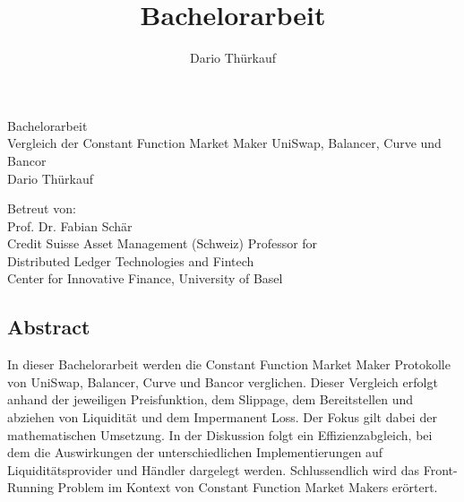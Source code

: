\documentclass[12pt,a4paper,titlepage,oneside,english]{article}
\title{Bachelorarbeit}
\author{Dario Thürkauf}
\begin{document}
\begin{center}
\vspace{1em}
\large{Bachelorarbeit}\\
\huge Vergleich der Constant Function Market Maker UniSwap, Balancer, Curve und Bancor \\
\Large \vspace{1em}
Dario Thürkauf
\end{center}

\vspace{1em}
\normalsize
\begin{flushleft}
Betreut von:\\ 
Prof. Dr. Fabian Schär \\
Credit Suisse Asset Management (Schweiz) Professor for \\ 
Distributed Ledger Technologies and Fintech \\
Center for Innovative Finance, University of Basel
\end{flushleft}

\vspace{1em}
\onehalfspacing
\begin{center}
\section*{Abstract}
\end{center}

In dieser Bachelorarbeit werden die Constant Function Market Maker Protokolle von UniSwap, Balancer, Curve und Bancor verglichen. Dieser Vergleich erfolgt anhand der jeweiligen Preisfunktion, dem Slippage, dem Bereitstellen und abziehen von Liquidität und dem Impermanent Loss. Der Fokus gilt dabei der mathematischen Umsetzung. In der Diskussion folgt ein Effizienzabgleich, bei dem die Auswirkungen der unterschiedlichen Implementierungen auf Liquiditätsprovider und Händler dargelegt werden. Schlussendlich wird das Front-Running Problem im Kontext von Constant Function Market Makers erörtert. \\
\end{document}
